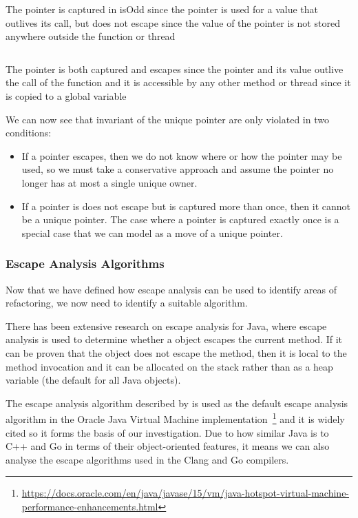 \documentclass{proposal}
\begin{document}
    \begin{listing}
        \inputminted{c++}{code/capture-example.cpp}
        \caption{The pointer is captured in isOdd since the pointer is used for a value that outlives its call, but does not escape since the value of the pointer is not stored anywhere outside the function or thread}
        \label{lst:capture-example}
    \end{listing}

    \begin{listing}
        \inputminted{c++}{code/escape-example.cpp}
        \caption{The pointer is both captured and escapes since the pointer and its value outlive the call of the function and it is accessible by any other method or thread since it is copied to a global variable}
        \label{lst:escape-example}
    \end{listing}

    We can now see that invariant of the unique pointer are only violated in two conditions:
    \begin{itemize}
        \item If a pointer escapes, then we do not know where or how the pointer may be used, so we must take a conservative approach and assume the pointer no longer has at most a single unique owner.
        \item If a pointer is does not escape but is captured more than once, then it cannot be a unique pointer.
        The case where a pointer is captured exactly once is a special case that we can model as a move of a unique pointer.
    \end{itemize}

    \subsubsection{Escape Analysis Algorithms}\label{subsubsec:escape-analysis-algorithms}

    Now that we have defined how escape analysis can be used to identify areas of refactoring, we now need to identify a suitable algorithm.

    There has been extensive research on escape analysis for Java, where escape analysis is used to determine whether a object escapes the current method.
    If it can be proven that the object does not escape the method, then it is local to the method invocation and it can be allocated on the stack rather than as a heap variable (the default for all Java objects).

    The escape analysis algorithm described by \citet{Choi1999} is used as the default escape analysis algorithm in the Oracle Java Virtual Machine implementation~\footnote{\url{https://docs.oracle.com/en/java/javase/15/vm/java-hotspot-virtual-machine-performance-enhancements.html}} and it is widely cited so it forms the basis of our investigation.
    Due to how similar Java is to C++ and Go in terms of their object-oriented features, it means we can also analyse the escape algorithms used in the Clang and Go compilers.
\end{document}
